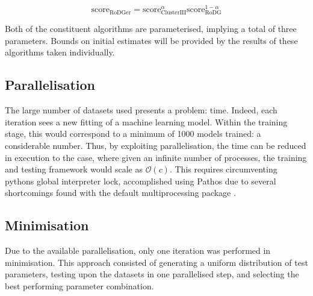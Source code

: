\begin{equation}
  \label{eq:holyTrinity}
  {\mathrm{score}_\mathrm{RoDGer}=\mathrm{score}_\mathrm{Cluster III}^{\alpha}\mathrm{score}_\mathrm{RoDG}^{1-\alpha}}
\end{equation}

Both of the constituent algorithms are parameterised, implying a total of three parameters. Bounds on initial estimates will be provided by the results of these algorithms taken individually.

\subsection{Parallelisation}
The large number of datasets used presents a problem: time. Indeed, each iteration sees a new fitting of a machine learning model. Within the training stage, this would correspond to a minimum of 1000 models trained: a considerable number. Thus, by exploiting parallelisation, the time can be reduced in execution to the case, where given an infinite number of processes, the training and testing framework would scale as $\mathcal{O}(c)$. This requires circumventing pythons global interpreter lock, accomplished using Pathos due to several shortcomings found with the default multiprocessing package \cite{pathos1,pathos2}.

\subsection{Minimisation}
Due to the available parallelisation, only one iteration was performed in minimisation. This approach consisted of generating a uniform distribution of test parameters, testing upon the datasets in one parallelised step, and selecting the best performing parameter combination.
